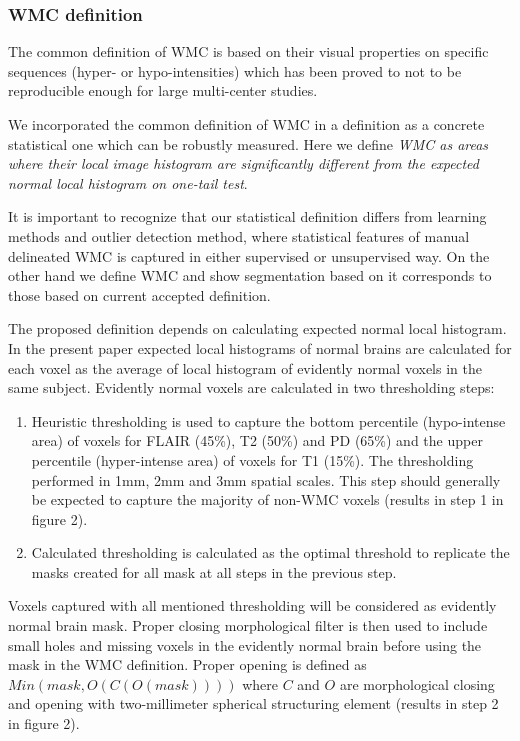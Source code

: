 \subsubsection{WMC definition}
The common definition of WMC is based on their visual properties on specific sequences (hyper- or hypo-intensities) which has been proved to not to be reproducible enough for large multi-center studies. 
\par
We incorporated the common definition of WMC in a definition as a concrete statistical one which can be robustly measured. Here we  define \textit{WMC as areas where their local image histogram are significantly different from the expected normal local histogram on one-tail test}.
\par
It is important to recognize that our statistical definition differs from learning methods and outlier detection method, where statistical features of manual delineated WMC is captured in either supervised or unsupervised way.
On the other hand we define WMC and show segmentation based on it corresponds to those based on current accepted definition.
\par
The proposed definition depends on calculating expected normal local histogram. In the present paper expected local histograms of normal brains are calculated for each voxel as the average of local histogram of evidently normal voxels in the same subject. Evidently normal voxels are calculated in two thresholding steps:
\begin{enumerate}
\item Heuristic thresholding is used to capture the bottom percentile (hypo-intense area) of voxels for FLAIR (45\%), T2 (50\%) and PD (65\%) and the upper percentile (hyper-intense area) of voxels for T1 (15\%). The thresholding performed in 1mm, 2mm and 3mm spatial scales. This step should generally be expected to capture the majority of non-WMC voxels (results in step 1 in figure 2).
\item Calculated thresholding is calculated as the optimal threshold \cite{ReduceSVM} to replicate the masks created for all mask at all steps in the previous step.
\end{enumerate}
Voxels captured with all mentioned thresholding will be considered as evidently normal brain mask. Proper closing morphological filter is then used to include small holes and missing voxels in the evidently normal brain before using the mask in the WMC definition. Proper opening is defined as $ Min(mask,O( C( O( mask )))  ) $ where $ C $ and $ O $ are morphological closing and opening with two-millimeter spherical structuring element (results in step 2 in figure 2).

    
    
    
    
    
    
    
    
    
  
  
  
  
  
  
  